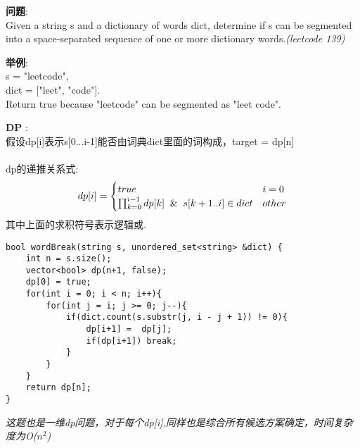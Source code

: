     
\begin{description}
    \item{\textbf{问题}}:\\
Given a string s and a dictionary of words dict, determine if s can be segmented into a space-separated sequence of one or more dictionary words.\textit{(leetcode 139)}

    \item{\textbf{举例}}:\\
s = "leetcode",\\
dict = ["leet", "code"].\\
Return true because "leetcode" can be segmented as "leet code".\\
    \item{\textbf{DP}} : 
	\\假设dp[i]表示s[0...i-1]能否由词典dict里面的词构成，target = dp[n]\\
	\\dp的递推关系式:
$$
dp[i] =
\begin{cases} 
true & i = 0 \\
\prod_{k=0}^{i-1}{dp[k] \And s[k+1..i] \in dict} & other
\end{cases}
$$
其中上面的求积符号表示逻辑或.
    \begin{lstlisting}
bool wordBreak(string s, unordered_set<string> &dict) {
	int n = s.size();
	vector<bool> dp(n+1, false);
	dp[0] = true;
	for(int i = 0; i < n; i++){
		for(int j = i; j >= 0; j--){
			if(dict.count(s.substr(j, i - j + 1)) != 0){
				dp[i+1] =  dp[j];
				if(dp[i+1])	break;
			}
		}
	}
	return dp[n];
}
    \end{lstlisting}
	\textit{这题也是一维dp问题，对于每个dp[i],同样也是综合所有候选方案确定，时间复杂度为O($n^2$)}
\end{description}


